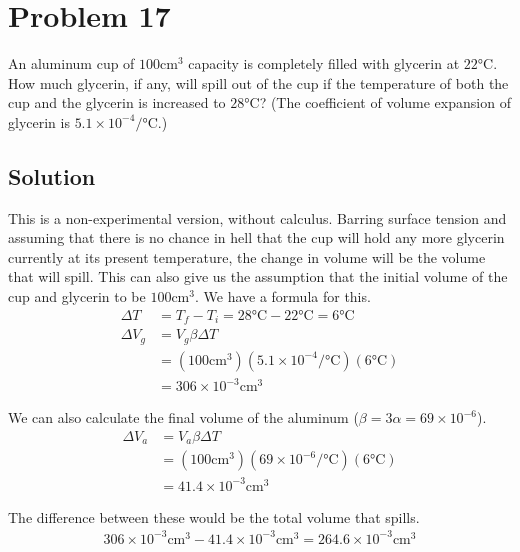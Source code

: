 \documentclass[12pt]{article}
\begin{document}
    \pagebreak
    \section{Problem 17}
        An aluminum cup of $100 \unit{\centi\meter^3}$ capacity is completely filled with glycerin at $22\unit{\celsius}$. How much glycerin, if any, will spill out of the cup if the temperature of both the cup and the glycerin is increased to $28\unit{\celsius}$? (The coefficient of volume expansion of glycerin is $5.1 \times 10^{-4}/\unit{\celsius}$.)

        \subsection{Solution}
            This is a non-experimental version, without calculus.
            Barring surface tension and assuming that there is no chance in hell that the cup will hold any more glycerin currently at its present temperature, the change in volume will be the volume that will spill.
            This can also give us the assumption that the initial volume of the cup and glycerin to be $100 \unit{\centi\meter^3}$. 
            We have a formula for this.
            \begin{align}
                \Delta T    &=  T_f - T_i
                    =   28\unit{\celsius} - 22 \unit{\celsius}
                    =   6 \unit{\celsius}\\
                \Delta V_g  &=  V_g \beta \Delta T\\
                    &=  (100\unit{\centi\meter^3}) (5.1 \times 10^{-4} /\unit{\celsius}) (6 \unit{\celsius})\\
                    &=  306 \times 10^{-3} \unit{\centi\meter^3}
            \end{align}

            We can also calculate the final volume of the aluminum ($\beta = 3\alpha = 69 \times 10^{-6}$).
            \begin{align}
                \Delta V_a  &=  V_a \beta \Delta T\\
                    &=  (100\unit{\centi\meter^3}) (69 \times 10^{-6} /\unit{\celsius}) (6 \unit{\celsius})\\
                    &=  41.4 \times 10^{-3} \unit{\centi\meter^3}
            \end{align}

            The difference between these would be the total volume that spills. 
            \begin{gather}
                306 \times 10^{-3} \unit{\centi\meter^3} - 41.4 \times 10^{-3} \unit{\centi\meter^3}    =   \boxed{264.6 \times 10^{-3} \unit{\centi\meter^3}}
            \end{gather}
\end{document}
